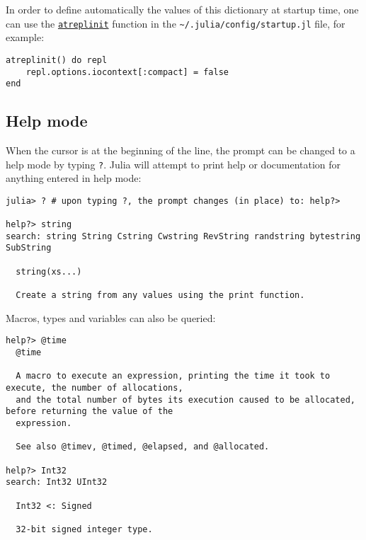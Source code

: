 In order to define automatically the values of this dictionary at startup time, one can use the \hyperlink{1741947168860119796}{\texttt{atreplinit}} function in the \texttt{{\textasciitilde}/.julia/config/startup.jl} file, for example:




\begin{verbatim}
atreplinit() do repl
    repl.options.iocontext[:compact] = false
end
\end{verbatim}



\hypertarget{8090123169740528583}{}


\subsection{Help mode}



When the cursor is at the beginning of the line, the prompt can be changed to a help mode by typing \texttt{?}. Julia will attempt to print help or documentation for anything entered in help mode:




\begin{verbatim}
julia> ? # upon typing ?, the prompt changes (in place) to: help?>

help?> string
search: string String Cstring Cwstring RevString randstring bytestring SubString

  string(xs...)

  Create a string from any values using the print function.
\end{verbatim}



Macros, types and variables can also be queried:




\begin{lstlisting}
help?> @time
  @time

  A macro to execute an expression, printing the time it took to execute, the number of allocations,
  and the total number of bytes its execution caused to be allocated, before returning the value of the
  expression.

  See also @timev, @timed, @elapsed, and @allocated.

help?> Int32
search: Int32 UInt32

  Int32 <: Signed

  32-bit signed integer type.
\end{lstlisting}



